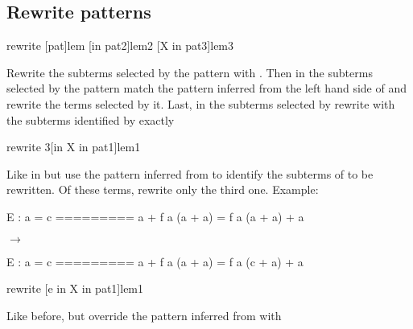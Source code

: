 \begin{landscape}
\begin{small}
\begin{multicols*}{3}[\begin{center}\section*{}\end{center}]
% 
% 


\subsection*{Rewrite patterns}

\begin{cheat}
rewrite [pat]lem [in pat2]lem2 [X in pat3]lem3
\end{cheat}
  Rewrite the subterms selected by the pattern  with .
  Then in the subterms selected by the pattern 
  match the pattern inferred from the left hand side of  and
  rewrite the terms selected by it. Last, in the subterms selected by
   rewrite with  the subterms identified by  exactly

\begin{cheat}
rewrite {3}[in X in pat1]lem1
\end{cheat}
  Like in  but use the pattern
  inferred from  to identify the subterms of  to be
  rewritten. Of these terms, rewrite only the third one. Example:

\begin{cheatout}
E : a = c
=========
a + f a (a + a) =
  f a (a + a) + a
\end{cheatout}
$\to$
\begin{cheatout}
E : a = c
=========
a + f a (a + a) =
  f a (c + a) + a
\end{cheatout}



\begin{cheat}
rewrite [e in X in pat1]lem1
\end{cheat}
  Like before, but override the pattern inferred from  with


\end{multicols*}
\end{small}
\end{landscape}
